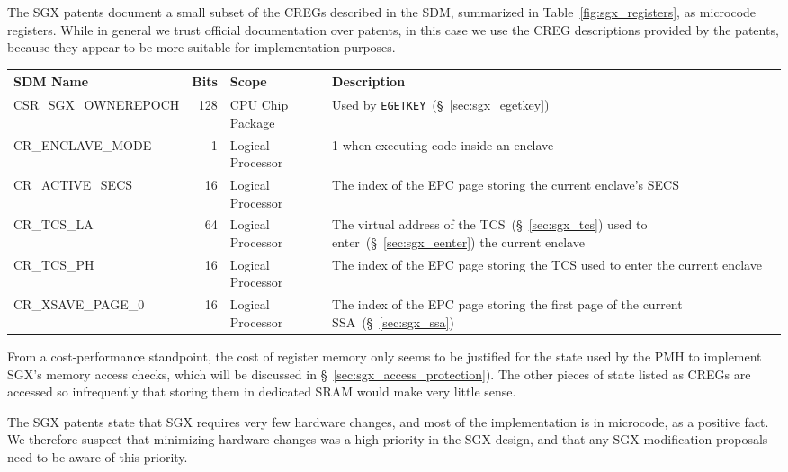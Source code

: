 
The SGX patents document a small subset of the CREGs described in the SDM,
summarized in Table~\ref{fig:sgx_registers}, as microcode registers. While in
general we trust official documentation over patents, in this case we use the
CREG descriptions provided by the patents, because they appear to be more
suitable for implementation purposes.


\begin{table*}[hbt]
  \centering
  \begin{tabularx}{\textwidth}{| l | r | l | X |}
  \hline
  \textbf{SDM Name} & \textbf{Bits} & \textbf{Scope} & \textbf{Description} \\
  \hline
  CSR\_SGX\_OWNEREPOCH & 128 & CPU Chip Package &
      Used by \texttt{EGETKEY}~(\S~\ref{sec:sgx_egetkey}) \\
  \hline
  CR\_ENCLAVE\_MODE & 1 & Logical Processor & 1 when executing code inside an
      enclave \\
  \hline
  CR\_ACTIVE\_SECS & 16 & Logical Processor & The index of the EPC page storing
      the current enclave's SECS \\
  \hline
  CR\_TCS\_LA & 64 & Logical Processor & The virtual address of the
      TCS~(\S~\ref{sec:sgx_tcs}) used to enter~(\S~\ref{sec:sgx_eenter}) the
      current enclave \\
  \hline
  CR\_TCS\_PH & 16 & Logical Processor & The index of the EPC page storing the
      TCS used to enter the current enclave \\
  \hline
  CR\_XSAVE\_PAGE\_0 & 16 & Logical Processor & The index of the EPC page
      storing the first page of the current SSA~(\S~\ref{sec:sgx_ssa}) \\
  \hline
  \end{tabularx}
  \caption{
    The fields in an EPCM entry.
  }
  \label{fig:sgx_registers}
\end{table*}

From a cost-performance standpoint, the cost of register memory only seems to
be justified for the state used by the PMH to implement SGX's memory access
checks, which will be discussed in \S~\ref{sec:sgx_access_protection}). The
other pieces of state listed as CREGs are accessed so infrequently that storing
them in dedicated SRAM would make very little sense.

The SGX patents state that SGX requires very few hardware changes, and most of
the implementation is in microcode, as a positive fact. We therefore suspect
that minimizing hardware changes was a high priority in the SGX design, and
that any SGX modification proposals need to be aware of this priority.

